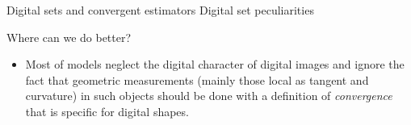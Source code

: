 \begin{frame}
{Digital sets and convergent estimators}
{Digital set peculiarities}

\begin{minipage}[t][0.35\textheight][t]{1\textwidth}

Where can we do better?

\begin{itemize}
\item{Most of models neglect the digital character of digital images and ignore the fact that geometric measurements (mainly those local as tangent and curvature) in such objects should be done with a definition of \emph{convergence} that is specific for digital shapes.}
\end{itemize}
\vspace{1em}


\end{minipage}
\end{frame}
